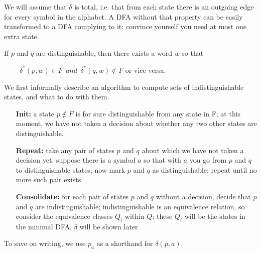 We will assume that $\delta$ is total, i.e. that from each state there
is an outgoing edge for every symbol in the alphabet. A DFA without
that property can be easily transformed to a DFA complying to it:
convince yourself you need at most one extra state.



If $p$ and $q$ are distinguishable, then there exists a word $w$ so that

$~~~~~~~~~~\delta^*(p,w) \in F~~and~~ \delta^*(q,w) \notin F$ or vice versa.


We first informally describe an algorithm to compute sets of
indistinguishable states, and what to do with them.

\begin{itemize}
\item[{\bf Init:}]
a state $p \notin F$ is for sure distinguishable from any state in
F; at this moment, we have not taken a decision about whether any two other states are distinguishable.

\item[{\bf Repeat:}]
take any pair of states $p$ and $q$ about which we have not taken a
decision yet: suppose there is a symbol $a$ so that with $a$ you go
from $p$ and $q$ to distinguishable states; now mark $p$ and $q$ as
distinguishable; repeat until no more such pair exists

\item[{\bf Consolidate:}]
for each pair of states $p$ and $q$ without a decision, decide that
$p$ and $q$ are indistinguishable; indistinguishable is an equivalence
relation, so consider the equivalence classes $Q_i$ within $Q$; these
$Q_i$ will be the states in the minimal DFA; $\delta$ will be shown
later
\end{itemize}

To save on writing, we use $p_a$ as a shorthand for $\delta(p,a)$.


